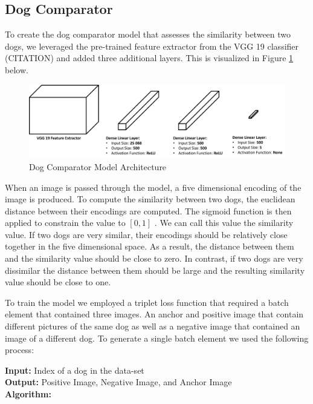\documentclass{article}
\begin{document}
\subsection{Dog Comparator}
To create the dog comparator model that assesses the similarity between two dogs, we leveraged the pre-trained feature extractor from the VGG 19 classifier (CITATION) and added three additional layers.  This is visualized in Figure \ref{fig:x comparator} below.

\begin{figure}[h]
\centering
	\includegraphics[scale=0.4]{final-report-images/dog_comparator.png}
\caption{Dog Comparator Model Architecture}
\label{fig:x comparator}
\end{figure}

\noindent When an image is passed through the model, a five dimensional encoding of the image is produced.  To compute the similarity between two dogs, 
the euclidean distance between their encodings are computed.  The sigmoid function is then applied to constrain the value to $[0,1]$ .  We can call this value the similarity value.  If two dogs are very similar, their encodings should be relatively close together in the five dimensional space.  As a result, the distance between them and the similarity value should be close to zero.  In contrast, if two dogs are very dissimilar the distance between them should be large and the resulting similarity value should be close to one.  

To train the model we employed a triplet loss function that required a batch element that contained three images.  An anchor and positive image that contain different pictures of the same dog as well as a negative image that contained an image of a different dog.  To generate a single batch element we used the following process: \\

\begin{minipage}{1\textwidth}%
  \noindent \textbf{Input:} Index of a dog in the data-set \\
  
  \noindent \textbf{Output:} Positive Image, Negative Image, and Anchor Image \\
  
  \noindent \textbf{Algorithm:} \\
\end{minipage}%
\end{document}
